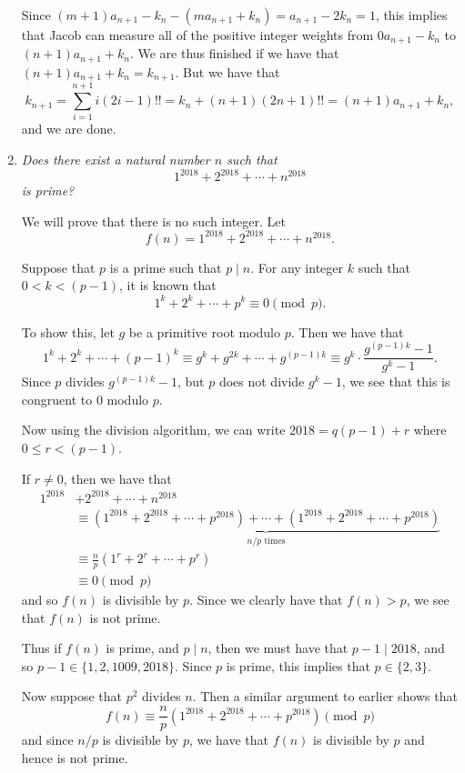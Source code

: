 \documentclass{article}
\begin{document}
\begin{enumerate}[1.]
Since $(m + 1) a_{n + 1} - k_n - (m a_{n + 1} + k_n) = a_{n + 1} - 2k_n = 1$, this implies that Jacob can measure all of the positive integer weights from $0 a_{n + 1} - k_n$ to $(n + 1) a_{n + 1} + k_n$. We are thus finished if we have that $(n + 1) a_{n + 1} + k_n = k_{n + 1}$. But we have that
\[
  k_{n + 1} = \sum_{i = 1}^{n + 1} i (2i - 1)!! = k_n + (n + 1) (2n + 1)!! = (n + 1) a_{n + 1} + k_n,
\]
and we are done.


\vspace{6pt}
\item
\textit{Does there exist a natural number $n$ such that
\[
	1^{2018} + 2^{2018} + \cdots + n^{2018}
\]
is prime?}

We will prove that there is no such integer. Let
\[
	f(n) = 1^{2018} + 2^{2018} + \cdots + n^{2018}.
\]

Suppose that $p$ is a prime such that $p \mid n$. For any integer $k$ such that $0 < k < (p - 1)$, it is known that
\[
	1^k + 2^k + \cdots + p^k \equiv 0 \pmod p.
\]

To show this, let $g$ be a primitive root modulo $p$. Then we have that
\[
	1^k + 2^k + \cdots + {(p - 1)}^k \equiv g^k + g^{2k} + \cdots + g^{(p - 1)k} \equiv g^k \cdot \frac{g^{(p - 1)k} - 1}{g^k - 1}.
\]
Since $p$ divides $g^{(p - 1)k} - 1$, but $p$ does not divide $g^k - 1$, we see that this is congruent to $0$ modulo $p$.

Now using the division algorithm, we can write $2018 = q(p - 1) + r$ where $0 \leq r < (p - 1)$.

If $r \neq 0$, then we have that
\begin{align*}
	1^{2018} & + 2^{2018} + \cdots + n^{2018} \\
	& \equiv \underbrace{\left(1^{2018} + 2^{2018} + \cdots + p^{2018} \right) + \cdots + \left( 1^{2018} + 2^{2018} + \cdots + p^{2018} \right)}_{n/p \text{ times}} \\
	& \equiv \frac{n}{p} \left( 1^r + 2^r + \cdots + p^r \right) \\
	& \equiv 0 \pmod p
\end{align*}
and so $f(n)$ is divisible by $p$. Since we clearly have that $f(n) > p$, we see that $f(n)$ is not prime.

Thus if $f(n)$ is prime, and $p \mid n$, then we must have that $p - 1 \mid 2018$, and so $p - 1 \in \{1, 2, 1009, 2018\}$. Since $p$ is prime, this implies that $p \in \{2, 3\}$.

Now suppose that $p^2$ divides $n$. Then a similar argument to earlier shows that
\[
	f(n) \equiv \frac{n}{p} \left( 1^{2018} + 2^{2018} + \cdots + p^{2018} \right) \pmod p
\]
and since $n/p$ is divisible by $p$, we have that $f(n)$ is divisible by $p$ and hence is not prime.


\end{enumerate}
\end{document}
